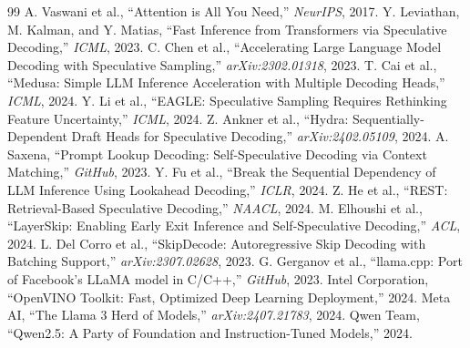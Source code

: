 \documentclass[journal,10pt,twocolumn]{article}
\theoremstyle{definition}
\begin{document}
\begin{thebibliography}{99}
 A. Vaswani et al., ``Attention is All You Need,'' \textit{NeurIPS}, 2017.
 Y. Leviathan, M. Kalman, and Y. Matias, ``Fast Inference from Transformers via Speculative Decoding,'' \textit{ICML}, 2023.
 C. Chen et al., ``Accelerating Large Language Model Decoding with Speculative Sampling,'' \textit{arXiv:2302.01318}, 2023.
 T. Cai et al., ``Medusa: Simple LLM Inference Acceleration with Multiple Decoding Heads,'' \textit{ICML}, 2024.
 Y. Li et al., ``EAGLE: Speculative Sampling Requires Rethinking Feature Uncertainty,'' \textit{ICML}, 2024.
 Z. Ankner et al., ``Hydra: Sequentially-Dependent Draft Heads for Speculative Decoding,'' \textit{arXiv:2402.05109}, 2024.
 A. Saxena, ``Prompt Lookup Decoding: Self-Speculative Decoding via Context Matching,'' \textit{GitHub}, 2023.
 Y. Fu et al., ``Break the Sequential Dependency of LLM Inference Using Lookahead Decoding,'' \textit{ICLR}, 2024.
 Z. He et al., ``REST: Retrieval-Based Speculative Decoding,'' \textit{NAACL}, 2024.
 M. Elhoushi et al., ``LayerSkip: Enabling Early Exit Inference and Self-Speculative Decoding,'' \textit{ACL}, 2024.
 L. Del Corro et al., ``SkipDecode: Autoregressive Skip Decoding with Batching Support,'' \textit{arXiv:2307.02628}, 2023.
 G. Gerganov et al., ``llama.cpp: Port of Facebook's LLaMA model in C/C++,'' \textit{GitHub}, 2023.
 Intel Corporation, ``OpenVINO Toolkit: Fast, Optimized Deep Learning Deployment,'' 2024.
 Meta AI, ``The Llama 3 Herd of Models,'' \textit{arXiv:2407.21783}, 2024.
 Qwen Team, ``Qwen2.5: A Party of Foundation and Instruction-Tuned Models,'' 2024.
\end{thebibliography}
\end{document}
